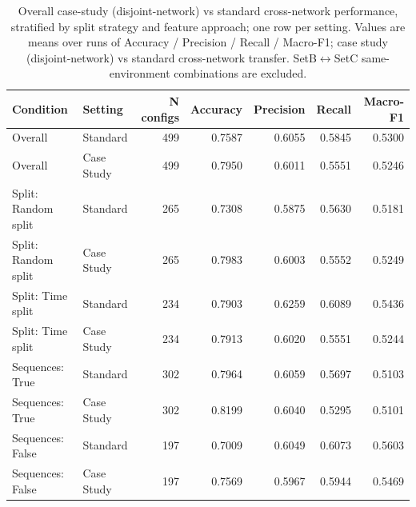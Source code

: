 \begin{table}
\caption{Overall case-study (disjoint-network) vs standard cross-network performance, stratified by split strategy and feature approach; one row per setting. Values are means over runs of Accuracy / Precision / Recall / Macro-F1; case study (disjoint-network) vs standard cross-network transfer. SetB$\leftrightarrow$SetC same-environment combinations are excluded.}
\label{tab:q5_appendix_overall}
\begin{tabular}{llrrrrr}
\toprule
Condition & Setting & N configs & Accuracy & Precision & Recall & Macro-F1 \\
\midrule
Overall & Standard & 499 & 0.7587 & 0.6055 & 0.5845 & 0.5300 \\
Overall & Case Study & 499 & 0.7950 & 0.6011 & 0.5551 & 0.5246 \\
Split: Random split & Standard & 265 & 0.7308 & 0.5875 & 0.5630 & 0.5181 \\
Split: Random split & Case Study & 265 & 0.7983 & 0.6003 & 0.5552 & 0.5249 \\
Split: Time split & Standard & 234 & 0.7903 & 0.6259 & 0.6089 & 0.5436 \\
Split: Time split & Case Study & 234 & 0.7913 & 0.6020 & 0.5551 & 0.5244 \\
Sequences: True & Standard & 302 & 0.7964 & 0.6059 & 0.5697 & 0.5103 \\
Sequences: True & Case Study & 302 & 0.8199 & 0.6040 & 0.5295 & 0.5101 \\
Sequences: False & Standard & 197 & 0.7009 & 0.6049 & 0.6073 & 0.5603 \\
Sequences: False & Case Study & 197 & 0.7569 & 0.5967 & 0.5944 & 0.5469 \\
\bottomrule
\end{tabular}
\end{table}
